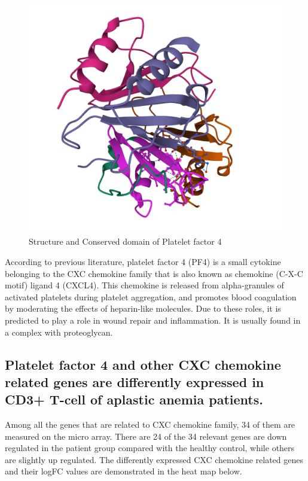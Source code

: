 \begin{figure}[H]
    \centering
    \includegraphics[width=1\textwidth]{image/PF43D2.png}
    \caption{Structure and Conserved domain of Platelet factor 4}
    \label{HMCD3}
\end{figure}

According to previous literature, platelet factor 4 (PF4) is a small cytokine belonging to the CXC chemokine family that is also known as chemokine (C-X-C motif) ligand 4 (CXCL4). This chemokine is released from alpha-granules of activated platelets during platelet aggregation, and promotes blood coagulation by moderating the effects of heparin-like molecules. Due to these roles, it is predicted to play a role in wound repair and inflammation. It is usually found in a complex with proteoglycan.\cite{fernandez2002structure}

\subsection{Platelet factor 4 and other CXC chemokine related genes are differently expressed in CD3+ T-cell of aplastic anemia patients.}

Among all the genes that are related to CXC chemokine family, 34 of them are measured on the micro array. There are 24 of the 34 relevant genes are down regulated in the patient group compared with the healthy control, while others are slightly up regulated. The differently expressed CXC chemokine related genes and their logFC values are demonstrated in the heat map below.

